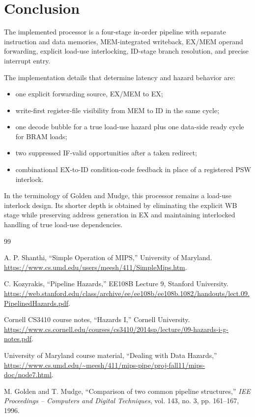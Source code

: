 \documentclass[11pt,a4paper]{article}
\begin{document}
\section{Conclusion}

The implemented processor is a four-stage in-order pipeline with separate instruction and data memories, MEM-integrated writeback, EX/MEM operand forwarding, explicit load-use interlocking, ID-stage branch resolution, and precise interrupt entry.

The implementation details that determine latency and hazard behavior are:
\begin{itemize}
    \item one explicit forwarding source, EX/MEM to EX;
    \item write-first register-file visibility from MEM to ID in the same cycle;
    \item one decode bubble for a true load-use hazard plus one data-side ready cycle for BRAM loads;
    \item two suppressed IF-valid opportunities after a taken redirect;
    \item combinational EX-to-ID condition-code feedback in place of a registered PSW interlock.
\end{itemize}

In the terminology of Golden and Mudge, this processor remains a load-use interlock design. Its shorter depth is obtained by eliminating the explicit WB stage while preserving address generation in EX and maintaining interlocked handling of true load-use dependencies.\cite{goldenmudge}

\newpage
\begin{thebibliography}{99}

A. P. Shanthi,
\newblock ``Simple Operation of MIPS,''
\newblock University of Maryland.
\newblock \url{https://www.cs.umd.edu/users/meesh/411/SimpleMips.htm}.

C. Kozyrakis,
\newblock ``Pipeline Hazards,'' EE108B Lecture 9,
\newblock Stanford University.
\newblock \url{https://web.stanford.edu/class/archive/ee/ee108b/ee108b.1082/handouts/lect.09.PipelinedHazards.pdf}.

Cornell CS3410 course notes,
\newblock ``Hazards I,''
\newblock Cornell University.
\newblock \url{https://www.cs.cornell.edu/courses/cs3410/2014sp/lecture/09-hazards-i-g-notes.pdf}.

University of Maryland course material,
\newblock ``Dealing with Data Hazards,''
\newblock \url{https://www.cs.umd.edu/~meesh/411/mips-pipe/proj-fall11/mips-doc/node7.html}.

M. Golden and T. Mudge,
\newblock ``Comparison of two common pipeline structures,''
\newblock \emph{IEE Proceedings -- Computers and Digital Techniques}, vol. 143, no. 3, pp. 161--167, 1996.

\end{thebibliography}
\end{document}
